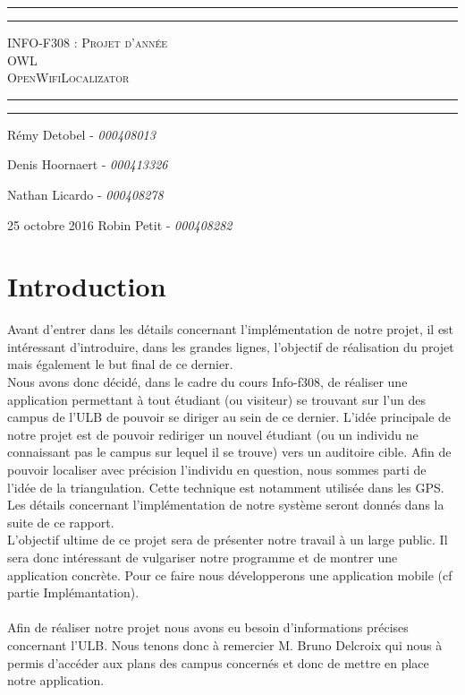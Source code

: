 \documentclass[11pt,a4paper]{article}
\title{}
\author{}
\begin{document}
\begin{center}
    \vspace*{\fill}
        \hrule
        \vspace*{2pt}
        \hrule
        \vspace*{15pt}
        \textsc{\Huge{INFO-F308 : Projet d'année \\\vspace*{8pt}
            OWL\\\vspace*{12pt}
            OpenWifiLocalizator}}
        \vspace*{15pt}
        \hrule
        \vspace*{2pt}
        \hrule
  \vspace*{\fill}
\end{center}
\null
\vfill

\large
\hfill Rémy Detobel - \emph{000408013}

\hfill Denis Hoornaert - \emph{000413326}

\hfill Nathan Licardo - \emph{000408278}

25 octobre 2016 \hfill Robin Petit - \emph{000408282}
\newpage

\tableofcontents

\newpage

\section{Introduction}
Avant d'entrer dans les détails concernant l'implémentation de notre projet, il est intéressant d'introduire, dans les grandes lignes, l'objectif de réalisation du projet mais également le but final de ce dernier.\\
Nous avons donc décidé, dans le cadre du cours Info-f308, de réaliser une application permettant à tout étudiant (ou visiteur) se trouvant sur l'un des campus de l'ULB de pouvoir se diriger au sein de ce dernier. L'idée principale de notre projet est de pouvoir rediriger un nouvel étudiant (ou un individu ne connaissant pas le campus sur lequel il se trouve) vers un auditoire cible. Afin de pouvoir localiser avec précision l'individu en question, nous sommes parti de l'idée de la triangulation. Cette technique est notamment utilisée dans les GPS. Les détails concernant l'implémentation de notre système seront donnés dans la suite de ce rapport.\\
L'objectif ultime de ce projet sera de présenter notre travail à un large public. Il sera donc intéressant de \og vulgariser \fg{} notre programme et de montrer une application concrète. Pour ce faire nous développerons une application mobile (cf partie Implémantation).\\\\
Afin de réaliser notre projet nous avons eu besoin d'informations précises concernant l'ULB. Nous tenons donc à remercier M. Bruno Delcroix qui nous à permis d'accéder aux plans des campus concernés et donc de mettre en place notre application.
\end{document}
